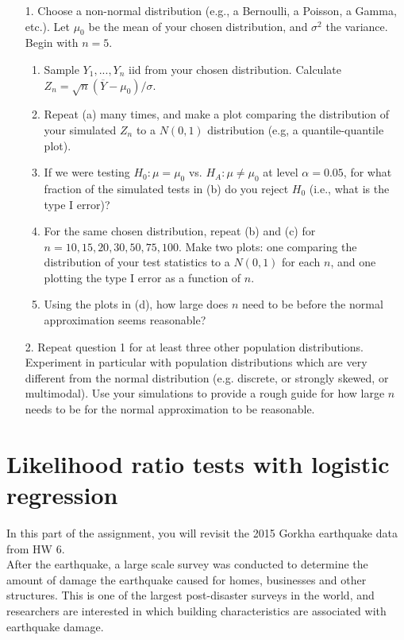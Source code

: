 \documentclass[11pt]{article}
\begin{document}
\begin{enumerate}
\item[1.] Choose a non-normal distribution (e.g., a Bernoulli, a Poisson, a Gamma, etc.). Let $\mu_0$ be the mean of your chosen distribution, and $\sigma^2$ the variance. Begin with $n = 5$.
\begin{enumerate}
\item Sample $Y_1,...,Y_n$ iid from your chosen distribution. Calculate $Z_n = \sqrt{n}(\overline{Y} - \mu_0)/\sigma$.
\item Repeat (a) many times, and make a plot comparing the distribution of your simulated $Z_n$ to a $N(0, 1)$ distribution (e.g, a quantile-quantile plot). 
\item If we were testing $H_0: \mu = \mu_0$ vs. $H_A: \mu \neq \mu_0$ at level $\alpha = 0.05$, for what fraction of the simulated tests in (b) do you reject $H_0$ (i.e., what is the type I error)?
\item For the same chosen distribution, repeat (b) and (c) for $n = 10, 15, 20, 30, 50, 75, 100$. Make two plots: one comparing the distribution of your test statistics to a $N(0,1)$ for each $n$, and one plotting the type I error as a function of $n$.
\item Using the plots in (d), how large does $n$ need to be before the normal approximation seems reasonable?
\end{enumerate}

\item[2.] Repeat question 1 for at least three other population distributions. Experiment in particular with population distributions which are very different from the normal distribution (e.g. discrete, or strongly skewed, or multimodal). Use your simulations to provide a rough guide for how large $n$ needs to be for the normal approximation to be reasonable.
\end{enumerate}

\section*{Likelihood ratio tests with logistic regression}

In this part of the assignment, you will revisit the 2015 Gorkha earthquake data from HW 6.\\

\noindent After the earthquake, a large scale survey was conducted to determine the amount of damage the earthquake caused for homes, businesses and other structures. This is one of the largest post-disaster surveys in the world, and researchers are interested in which building characteristics are associated with earthquake damage.\\
\end{document}
